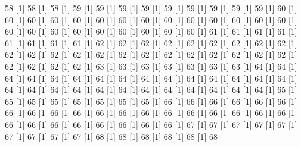 \documentclass[12pt]{article}
\begin{document}
\begin{Schunk}
\begin{Soutput}
[1] 58%
[1] 58%
[1] 58%
[1] 59%
[1] 59%
[1] 59%
[1] 59%
[1] 59%
[1] 59%
[1] 59%
[1] 59%
[1] 59%
[1] 60%
[1] 60%
[1] 60%
[1] 60%
[1] 60%
[1] 60%
[1] 60%
[1] 60%
[1] 60%
[1] 60%
[1] 60%
[1] 60%
[1] 60%
[1] 60%
[1] 60%
[1] 60%
[1] 60%
[1] 60%
[1] 60%
[1] 60%
[1] 60%
[1] 60%
[1] 60%
[1] 61%
[1] 61%
[1] 61%
[1] 61%
[1] 61%
[1] 61%
[1] 61%
[1] 61%
[1] 62%
[1] 62%
[1] 62%
[1] 62%
[1] 62%
[1] 62%
[1] 62%
[1] 62%
[1] 62%
[1] 62%
[1] 62%
[1] 62%
[1] 62%
[1] 62%
[1] 62%
[1] 62%
[1] 62%
[1] 62%
[1] 62%
[1] 62%
[1] 62%
[1] 62%
[1] 62%
[1] 62%
[1] 62%
[1] 62%
[1] 63%
[1] 63%
[1] 63%
[1] 63%
[1] 63%
[1] 63%
[1] 63%
[1] 64%
[1] 64%
[1] 64%
[1] 64%
[1] 64%
[1] 64%
[1] 64%
[1] 64%
[1] 64%
[1] 64%
[1] 64%
[1] 64%
[1] 64%
[1] 64%
[1] 64%
[1] 64%
[1] 64%
[1] 64%
[1] 64%
[1] 64%
[1] 64%
[1] 64%
[1] 64%
[1] 64%
[1] 64%
[1] 64%
[1] 64%
[1] 65%
[1] 65%
[1] 65%
[1] 65%
[1] 65%
[1] 65%
[1] 65%
[1] 65%
[1] 66%
[1] 66%
[1] 66%
[1] 66%
[1] 66%
[1] 66%
[1] 66%
[1] 66%
[1] 66%
[1] 66%
[1] 66%
[1] 66%
[1] 66%
[1] 66%
[1] 66%
[1] 66%
[1] 66%
[1] 66%
[1] 66%
[1] 66%
[1] 66%
[1] 66%
[1] 66%
[1] 66%
[1] 66%
[1] 66%
[1] 66%
[1] 67%
[1] 67%
[1] 67%
[1] 67%
[1] 67%
[1] 67%
[1] 67%
[1] 67%
[1] 67%
[1] 68%
[1] 68%
[1] 68%
[1] 68%
[1] 68%
[1] 68%

\end{Soutput}
\end{Schunk}
\end{document}
